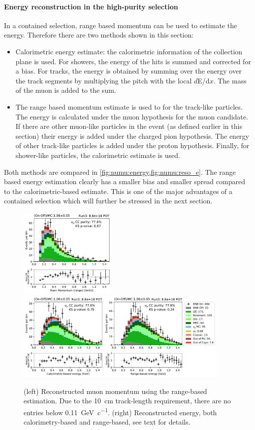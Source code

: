 \paragraph{Energy reconstruction in the high-purity selection} 
In a contained selection, range based momentum can be used to estimate the energy. Therefore there are two methods shown in this section:
\begin{itemize}
    \item Calorimetric energy estimate: the calorimetric information of the collection plane is used. For showers, the energy of the hits is summed and corrected for a bias. For tracks, the energy is obtained by summing over the energy over the track segments by multiplying the pitch with the local $d$E/d$x$. The mass of the muon is added to the sum.
    \item The range based momentum estimate is used to for the track-like particles. The energy is calculated under the muon hypothesis for the muon candidate. If there are other muon-like particles in the event (as defined earlier in this section) their energy is added under the charged pion hypothesis. The energy of other track-like particles is added under the proton hypothesis. Finally, for shower-like particles, the calorimetric estimate is used.
\end{itemize}
Both methods are compared in \cref{fig:numu:energy,fig:numu:reso_e}. The range based energy estimation clearly has a smaller bias and smaller spread compared to the calorimetric-based estimate. This is one of the major advantages of a contained selection which will further be stressed in the next section.

\begin{figure}[H]
    \centering
    \includegraphics[height=4.35cm]{NuMuCCsel/Images/run3/numu_rangemom_run3} \hspace{2mm}
    \includegraphics[height=4.35cm]{NuMuCCsel/Images/run3/numu_caloe_rangevscalo_run3.pdf}
    \caption{(left) Reconstructed muon momentum using the range-based estimation. Due to the \SI{10}{\cm} track-length requirement, there are no entries below \SI{0.11}{\GeV \per c}. (right) Reconstructed energy, both calorimetry-based and range-based, see text for details.}
    \label{fig:numu:energy}
\end{figure}

